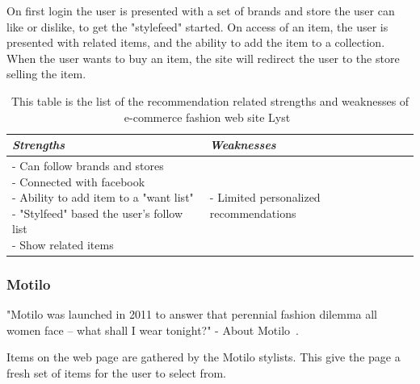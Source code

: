     On first login the user is presented with a set of brands and store the user can like or dislike, to get the "stylefeed" started.
    On access of an item, the user is presented with related items, and the ability to add the item to a collection.
    When the user wants to buy an item, the site will redirect the user to the store selling the item.
    \begin{table}[H]
        \centering
        \begin{tabular}{l|l}
            \toprule
            \emph{Strengths} & \emph{Weaknesses} \\ \hline
            \pbox{9cm}{
                - Can follow brands and stores \\
                - Connected with facebook \\
                - Ability to add item to a "want list" \\
                - "Stylfeed" based the user's follow list \\
                - Show related items
            } & \pbox{9cm}{
                - Limited personalized recommendations \\
            } \\ \bottomrule
        \end{tabular}
        \caption[Recommendation related strengths and weaknesses of Lyst~\cite{lyst}]{This table is the list of the recommendation related strengths and weaknesses of e-commerce fashion web site Lyst~\cite{lyst}}
        \label{table:ecommenreceLyst}
    \end{table}

\subsubsection{Motilo} %
\label{par:motilo}
    "Motilo was launched in 2011 to answer that perennial fashion dilemma all women face – what shall I wear tonight?" - About Motilo~\cite{motilo}.

    Items on the web page are gathered by the Motilo stylists.
    This give the page a fresh set of items for the user to select from.

